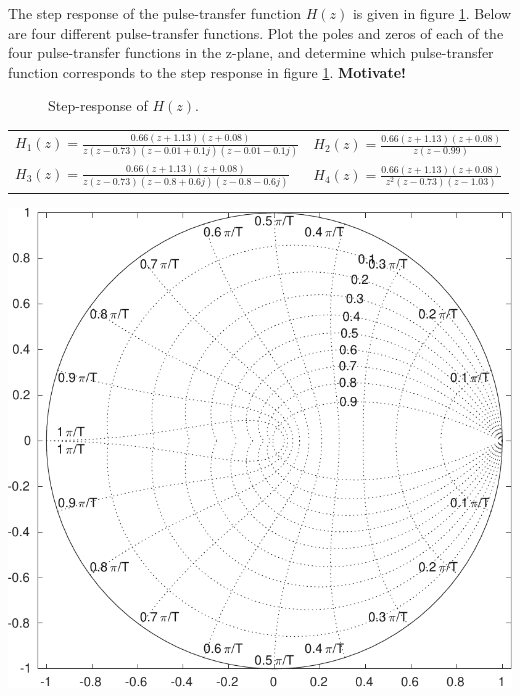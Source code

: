 \documentclass[letterpaper,12pt]{scrartcl}
\newenvironment{exercise}[1][Problem]{\begin{trivlist} \item[\hskip
    \labelsep {\stepcounter{exerctr}\bfseries #1
      \arabic{exerctr}}]}{\end{trivlist}\vspace{10mm}}
\newcounter{exerctr}
\begin{document}
\begin{exercise}

The step response of the pulse-transfer function $H(z)$ is given in figure \ref{fig:step}. Below are four different pulse-transfer functions. Plot the poles and zeros of each of the four pulse-transfer functions in the z-plane, and determine which pulse-transfer function corresponds to the step response in figure \ref{fig:step}. \textbf{Motivate!}


\begin{figure}[h]
\begin{center}
\caption{Step-response of $H(z)$.}
\label{fig:step}
\end{center}
\end{figure}

\begin{tabular}{ll}
$H_1(z) = \frac{0.66(z+1.13)(z+0.08)}{z(z-0.73)(z-0.01 + 0.1j)(z-0.01 - 0.1j)} $ &
$H_2(z) = \frac{0.66(z+1.13)(z+0.08)}{z(z-0.99)} $\\[4mm]
$H_3(z) = \frac{0.66(z+1.13)(z+0.08)}{z(z-0.73)(z-0.8 + 0.6j)(z-0.8 - 0.6j)} $ &
$H_4(z) = \frac{0.66(z+1.13)(z+0.08)}{z^2(z-0.73)(z-1.03)}$
\end{tabular}

\begin{center}
\includegraphics[width=0.7\linewidth]{../../figures/zgrid-crop}
\end{center}


\end{exercise}
\end{document}
